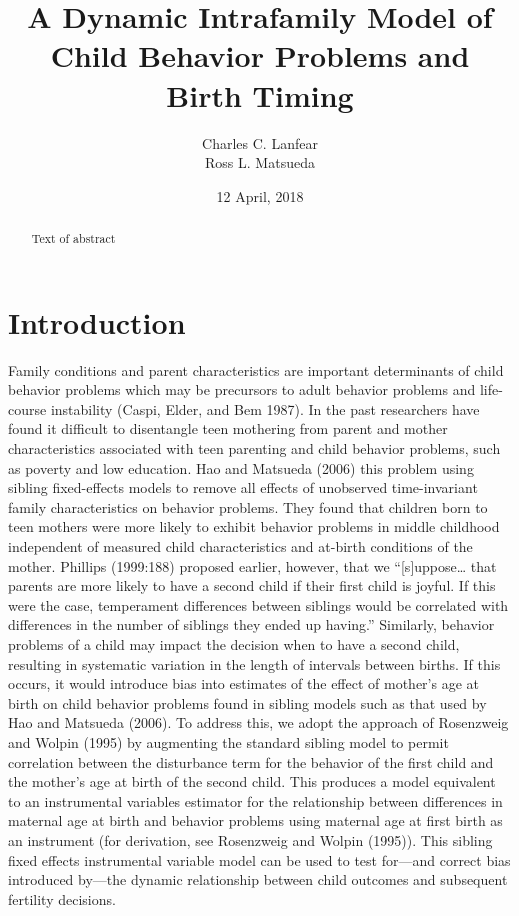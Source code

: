 \documentclass[]{article}
\title{A Dynamic Intrafamily Model of Child Behavior Problems and Birth Timing}
\author{Charles C. Lanfear \\ Ross L. Matsueda}
\date{12 April, 2018}
\begin{document}
\maketitle
\begin{abstract}
Text of abstract
\end{abstract}

{
\setcounter{tocdepth}{2}
\tableofcontents
}
\section{Introduction}\label{introduction}

Family conditions and parent characteristics are important determinants
of child behavior problems which may be precursors to adult behavior
problems and life-course instability (Caspi, Elder, and Bem 1987). In
the past researchers have found it difficult to disentangle teen
mothering from parent and mother characteristics associated with teen
parenting and child behavior problems, such as poverty and low
education. Hao and Matsueda (2006) this problem using sibling
fixed-effects models to remove all effects of unobserved time-invariant
family characteristics on behavior problems. They found that children
born to teen mothers were more likely to exhibit behavior problems in
middle childhood independent of measured child characteristics and
at-birth conditions of the mother. Phillips (1999:188) proposed earlier,
however, that we ``{[}s{]}uppose\ldots{} that parents are more likely to
have a second child if their first child is joyful. If this were the
case, temperament differences between siblings would be correlated with
differences in the number of siblings they ended up having.'' Similarly,
behavior problems of a child may impact the decision when to have a
second child, resulting in systematic variation in the length of
intervals between births. If this occurs, it would introduce bias into
estimates of the effect of mother's age at birth on child behavior
problems found in sibling models such as that used by Hao and Matsueda
(2006). To address this, we adopt the approach of Rosenzweig and Wolpin
(1995) by augmenting the standard sibling model to permit correlation
between the disturbance term for the behavior of the first child and the
mother's age at birth of the second child. This produces a model
equivalent to an instrumental variables estimator for the relationship
between differences in maternal age at birth and behavior problems using
maternal age at first birth as an instrument (for derivation, see
Rosenzweig and Wolpin (1995)). This sibling fixed effects instrumental
variable model can be used to test for---and correct bias introduced
by---the dynamic relationship between child outcomes and subsequent
fertility decisions.
\end{document}
